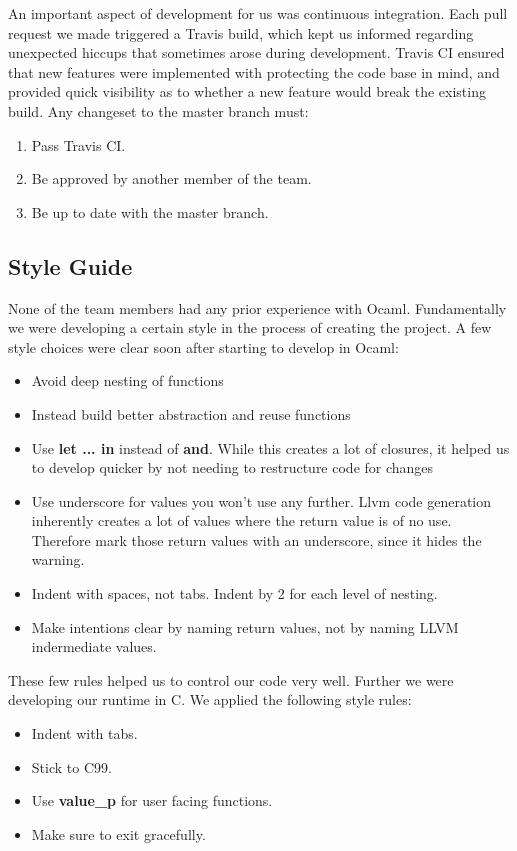   \medskip \noindent
  An important aspect of development for us was continuous integration. Each pull request we made triggered a Travis build, which kept us informed regarding unexpected hiccups that sometimes arose during development. Travis CI ensured that new features were implemented with protecting the code base in mind, and provided quick visibility as to whether a new feature would break the existing build. Any changeset to the master branch must:

  \begin{enumerate}
    \item Pass Travis CI.
    \item Be approved by another member of the team.
    \item Be up to date with the master branch.
  \end{enumerate}
  
\subsection{Style Guide}
  None of the team members had any prior experience with Ocaml. Fundamentally we were developing a certain style in the process of creating the project. A few style choices were clear soon after starting to develop in Ocaml:
  \begin{itemize}
  \item Avoid deep nesting of functions
  \item Instead build better abstraction and reuse functions
  \item Use \textbf{let ... in} instead of \textbf{and}. While this creates a lot of closures, it helped us to develop quicker by not needing to restructure code for changes
  \item Use underscore for values you won't use any further. Llvm code generation inherently creates a lot of values where the return value is of no use. Therefore mark those return values with an underscore, since it hides the warning. 
  \item Indent with spaces, not tabs. Indent by 2 for each level of nesting.
  \item Make intentions clear by naming return values, not by naming LLVM indermediate values.
  \end{itemize}
These few rules helped us to control our code very well.\newline
Further we were developing our runtime in C. We applied the following style rules:
  \begin{itemize}
  \item Indent with tabs.
  \item Stick to C99.
  \item Use \textbf{value\_p} for user facing functions.
  \item Make sure to exit gracefully.
  \end{itemize}

